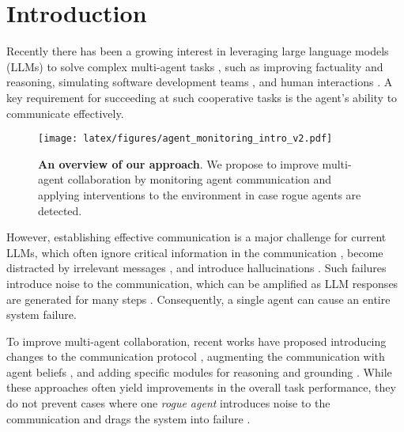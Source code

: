 \section{Introduction}
\label{sec:intro}

Recently there has been a growing interest in leveraging large language models (LLMs) to solve complex multi-agent tasks \cite{guo2024largelanguagemodelbased,tran2025multiagentcollaborationmechanismssurvey}, such as improving factuality and reasoning, \cite{du2023improvingfactualityreasoninglanguage, liang-etal-2024-encouraging} simulating software development teams \cite{hong2024metagpt, qian-etal-2024-chatdev, liu2024a}, and human interactions \cite{10.1145/3586183.3606763}. A key requirement for succeeding at such cooperative tasks is the agent's ability to communicate effectively.

\begin{figure}[t]
\centering
  \texttt{[image: latex/figures/agent\_monitoring\_intro\_v2.pdf]}
  \caption{\textbf{An overview of our approach}. We propose to improve multi-agent collaboration by monitoring agent communication and applying interventions to the environment in case rogue agents are detected.}
  \label{fig:intro}
\end{figure}

However, establishing effective communication is a major challenge for current LLMs, which often ignore critical information in the communication \cite{liu-etal-2024-lost, levy-etal-2024-task}, become distracted by irrelevant messages \cite{shi2023large, amayuelas-etal-2024-multiagent}, and introduce hallucinations \cite{xiao-wang-2021-hallucination, zhang2023sirenssongaiocean, jiang2024surveylargelanguagemodel, lin2024maoframeworkprocessmodel, Huang_2025}.
Such failures introduce noise to the  communication, which can be amplified as LLM responses are generated for many steps \cite{zhang2024how, ivgi2024from, yoran-etal-2024-assistantbench, jimenez2024swebench}. Consequently, a single agent can cause an entire system failure.

To improve multi-agent collaboration, recent works have proposed introducing changes to the communication protocol \cite{guo2024embodiedllmagentslearn, mehta-etal-2024-improving}, augmenting the communication with agent beliefs \cite{li-etal-2023-theory}, and adding specific modules for reasoning and grounding \cite{agashe2023evaluating, hong2024metagpt}.
While these approaches often yield improvements in the overall task performance, they do not prevent cases where one \textit{rogue agent} introduces noise to the communication and drags the system into failure \cite{darcy2024margmultiagentreviewgeneration, hong2024metagpt}.


